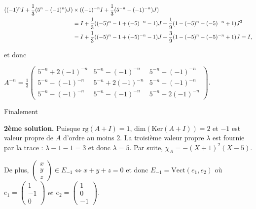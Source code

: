 {{\begin{align*}\ensuremath
((-1)^nI+\frac{1}{3}(5^n-(-1)^n)J)&\times((-1)^{-n}I+\frac{1}{3}(5^{-n}-(-1)^{-n})J)\\
 &=I+\frac{1}{3}((-5)^n-1+(-5)^{-n}-1)J+\frac{1}{9}(1-(-5)^n-(-5)^{-n}+1)J^2\\
 &=I+\frac{1}{3}((-5)^n-1+(-5)^{-n}-1)J+\frac{3}{9}(1-(-5)^n-(-5)^{-n}+1)J=I,
\end{align*}

et donc

\begin{center}
$
A^{-n}=\frac{1}{3}\left(\begin{array}{ccc}
5^{-n}+2(-1)^{-n}&5^{-n}-(-1)^{-n}&5^{-n}-(-1)^{-n}\\
5^{-n}-(-1)^{-n}&5^{-n}+2(-1)^{-n}&5^{-n}-(-1)^{-n}\\
5^{-n}-(-1)^{-n}&5^{-n}-(-1)^{-n}&5^{-n}+2(-1)^{-n}
\end{array}
\right)$.
\end{center}

Finalement

\begin{center}
\end{center}

\textbf{2ème solution.} Puisque $\text{rg}(A+I)=1$, $\text{dim}(\text{Ker}(A+I))=2$ et $-1$ est valeur propre de $A$ d'ordre au moins $2$. La troisième valeur propre $\lambda$ est fournie par la trace : $\lambda-1-1=3$ et donc $\lambda=5$. Par suite, $\chi_A=-(X+1)^2(X-5)$.

De plus, $\left(\begin{array}{c}
x\\
y\\
z
\end{array}
\right)\in E_{-1}\Leftrightarrow x+y+z=0$ et donc $E_{-1}=\text{Vect}(e_1,e_2)$ où $e_1=\left(\begin{array}{c}
1\\
-1\\
0
\end{array}
\right)$ et $e_2=\left(\begin{array}{c}
1\\
0\\
-1
\end{array}
\right)$.

}}
